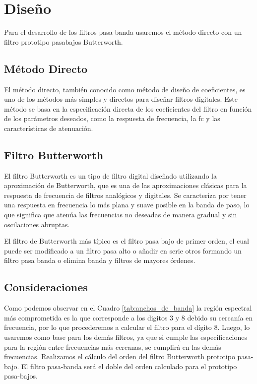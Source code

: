 \section{Diseño}
Para el desarrollo de los filtros pasa banda usaremos el método directo con un filtro prototipo pasabajos Butterworth.

\subsection*{Método Directo}
El método directo, también conocido como método de diseño de coeficientes, es uno de los métodos más simples y directos para diseñar filtros digitales. Este método se basa en la especificación directa de los coeficientes del filtro en función de los parámetros deseados, como la respuesta de frecuencia, la \gls{fc} y las características de atenuación.

\subsection*{Filtro Butterworth}
El filtro Butterworth es un tipo de filtro digital diseñado utilizando la aproximación de Butterworth, que es una de las aproximaciones clásicas para la respuesta de frecuencia de filtros analógicos y digitales. Se caracteriza por tener una respuesta en frecuencia lo más plana y suave posible en la banda de paso, lo que significa que atenúa las frecuencias no deseadas de manera gradual y sin oscilaciones abruptas.

El filtro de Butterworth más típico es el filtro pasa bajo de primer orden, el cual puede ser modificado a un filtro pasa alto o añadir en serie otros formando un filtro pasa banda o elimina banda y filtros de mayores órdenes.

\subsection*{Consideraciones}
Como podemos observar en el Cuadro \ref{tab:anchos_de_banda} la región espectral más comprometida es la que corresponde a los digitos 3 y 8 debido su cercanía en frecuencia, por lo que procederemos a calcular el filtro para el dígito 8. Luego, lo usaremos como base para los demás filtros, ya que si cumple las especificaciones para la región entre frecuencias más cercanas, se cumplirá en las demás frecuencias. Realizamos el cálculo del orden del filtro Butterworth prototipo pasa-bajo. El filtro pasa-banda será el doble del orden calculado para el prototipo pasa-bajos.

